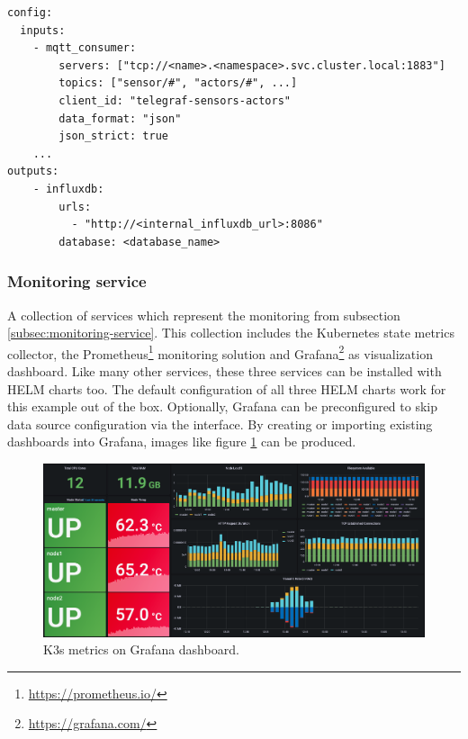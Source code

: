 \begin{lstlisting}[caption={HELM configuration for storing MQTT messages into InfluxDB by using Telegraf.},label={lst:k3s-timeseries-telegraf-config},captionpos=b]
config:
  inputs:
    - mqtt_consumer:
        servers: ["tcp://<name>.<namespace>.svc.cluster.local:1883"]
        topics: ["sensor/#", "actors/#", ...]
        client_id: "telegraf-sensors-actors"
        data_format: "json"
        json_strict: true
    ...
outputs:
    - influxdb:
        urls:
          - "http://<internal_influxdb_url>:8086"
        database: <database_name>
\end{lstlisting}

\subsubsection*{Monitoring service}
A collection of services which represent the monitoring from subsection \ref{subsec:monitoring-service}. This collection includes the Kubernetes state metrics collector, the Prometheus\footnote{\url{https://prometheus.io/}} monitoring solution and Grafana\footnote{\url{https://grafana.com/}} as visualization dashboard. Like many other services, these three services can be installed with HELM charts too. The default configuration of all three HELM charts work for this example out of the box. Optionally, Grafana can be preconfigured to skip data source configuration via the interface. By creating or importing existing dashboards into Grafana, images like figure \ref{fig:k3s-grafana-k3s-metrics} can be produced.

\begin{figure}[H]
    \centering
    \includegraphics[width=\textwidth]{assets/k3s/screenshots/grafana-k3s-metrics.png}
    \caption{K3s metrics on Grafana dashboard.}\label{fig:k3s-grafana-k3s-metrics}
\end{figure}

